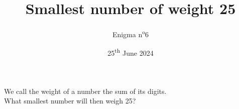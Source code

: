 \documentclass[a4paper, top=10mm]{article}
\title{\textbf{\huge{Smallest number of weight 25}}}
\author{Enigma n\textsuperscript{o}6}
\date{25\textsuperscript{th} June 2024}
\begin{document}
	\maketitle
	
	\Large
	We call the weight of a number the sum of its digits.\\
	What smallest number will then weigh 25?
	
	\vspace{1cm}
	
	\begin{center}
	\end{center}
	
	
\end{document}
